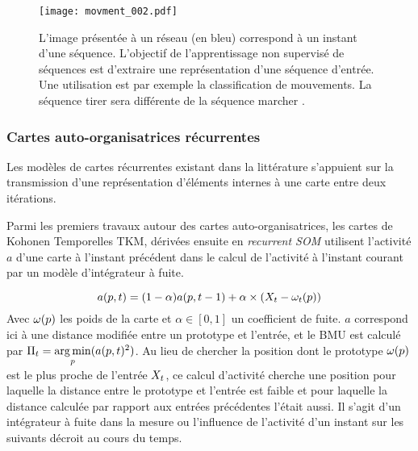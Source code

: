 \documentclass[../main]{subfiles}
\begin{document}
\begin{figure}
    \centering\texttt{[image: movment\_002.pdf]}
    \caption{L'image présentée à un réseau (en bleu) correspond à un instant d'une séquence. L'objectif de l'apprentissage non supervisé de séquences est d'extraire une représentation d'une séquence d'entrée. Une utilisation est par exemple la classification de mouvements. La séquence \og tirer \fg{} sera différente de la séquence \og marcher \fg{}.\label{fig:mouvement}}
 \end{figure}


\subsubsection{Cartes auto-organisatrices récurrentes}

Les modèles de cartes récurrentes existant dans la littérature s'appuient sur la transmission d'une représentation d'éléments internes à une carte entre deux itérations.

Parmi les premiers travaux autour des cartes auto-organisatrices, les cartes de Kohonen Temporelles TKM, dérivées ensuite en \emph{recurrent SOM} \parencite{varsta_temporal_2001} utilisent l'activité $a$ d'une carte à l'instant précédent dans le calcul de l'activité à l'instant courant par un modèle d'intégrateur à fuite.

$$a(p,t) = (1-\alpha)a(p,t-1) + \alpha \times (X_t - \omega_t(p))$$
Avec $\omega(p)$ les poids de la carte et $\alpha \in [0,1]$ un coefficient de fuite.
$a$ correspond ici à une distance modifiée entre un prototype et l'entrée, et le BMU est calculé par $\Pi_t = \operatorname*{arg\,min}\limits_p(a(p,t)^2)$.
Au lieu de chercher la position dont le prototype $\omega(p)$ est le plus proche de l'entrée $X_t$, ce calcul d'activité cherche une position pour laquelle la distance entre le prototype et l'entrée est faible et pour laquelle la distance calculée par rapport aux entrées précédentes l'était aussi. Il s'agit d'un intégrateur à fuite dans la mesure ou l'influence de l'activité d'un instant sur les suivants décroit au cours du temps.
\end{document}
